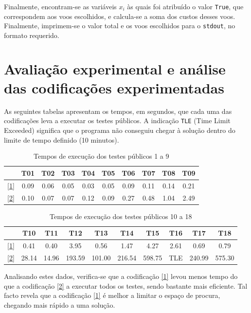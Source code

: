\documentclass[12pt,a4paper]{article}
\begin{document}
        Finalmente, encontram-se as variáveis $x_i$ às quais foi atribuído o valor \texttt{True}, que correspondem aos voos escolhidos, e calcula-se a soma dos custos desses voos. Finalmente, imprimem-se o valor total e os voos escolhidos para o \texttt{stdout}, no formato requerido.

    \section{Avaliação experimental e análise das codificações experimentadas}
        As seguintes tabelas apresentam os tempos, em segundos, que cada uma das codificações leva a executar os testes públicos. A indicação \texttt{TLE} (Time Limit Exceeded) significa que o programa não conseguiu chegar à solução dentro do limite de tempo definido (10 minutos).

        \begin{table}[h]
            \centering
            \begin{tabular}{|c|*{9}{c|}} %
            \hline
                & T01 & T02 & T03 & T04 & T05 & T06 & T07 & T08 & T09 \\ \hline
            \ref{1} & 0.09 & 0.06 & 0.05 & 0.03 & 0.05 & 0.09 & 0.11 & 0.14 & 0.21 \\ \hline
            \ref{2} & 0.10 & 0.07 & 0.07 & 0.12 & 0.09 & 0.27 & 0.48 & 1.04 & 2.49 \\ \hline
            \end{tabular}
            \caption{Tempos de execução dos testes públicos 1 a 9}
            \label{execution_times_part1}
        \end{table}
        
        \begin{table}[h]
            \centering
            \begin{tabular}{|c|*{9}{c|}} %
            \hline
                & T10 & T11 & T12 & T13 & T14 & T15 & T16 & T17 & T18 \\ \hline
            \ref{1} & 0.41 & 0.40 & 3.95 & 0.56 & 1.47 & 4.27 & 2.61 & 0.69 & 0.79 \\ \hline
            \ref{2} & 28.14 & 14.96 & 193.59 & 101.00 & 216.54 & 598.75 & TLE & 240.99 & 575.30 \\ \hline
            \end{tabular}
            \caption{Tempos de execução dos testes públicos 10 a 18}
            \label{execution_times_part2}
        \end{table}

        Analisando estes dados, verifica-se que a codificação \ref{1} levou menos tempo do que a codificação \ref{2} a executar todos os testes, sendo bastante mais eficiente. Tal facto revela que a codificação \ref{1} é melhor a limitar o espaço de procura, chegando mais rápido a uma solução.
\end{document}
